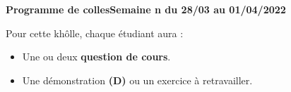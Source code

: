 \documentclass[twoside,a4paper,french,10pt]{VcCours}
\begin{document}

\begin{center}
\large\bf
Programme de collesSemaine n du 28/03 au 01/04/2022
\end{center}
\separationTitre

\vspace*{-1em}
Pour cette khôlle, chaque étudiant aura :
\begin{itemize}
\item Une ou deux \textbf{question de cours}.
\item Une démonstration \textbf{(D)} ou un exercice à retravailler.
\end{itemize} 
  
\end{document}
